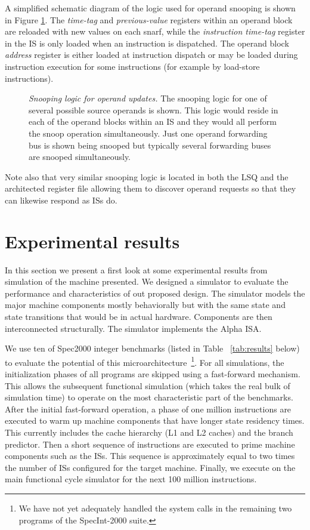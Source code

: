 \documentclass[10pt,dvips]{article}
\begin{document}
A simplified schematic diagram of the logic used for operand snooping
is shown in Figure \ref{fig:source}.
The {\em time-tag} and
{\em previous-value} registers within an operand block
are reloaded with new values on each snarf,
while the
{\em instruction time-tag} register in the IS
is only loaded when an instruction is dispatched.
The operand block {\em address} register is either loaded at instruction
dispatch or may be loaded during instruction execution for some
instructions
(for example by load-store instructions).
%
\begin{figure}
\centering
{}
\caption{{\em Snooping logic for operand updates.} 
\small{
The snooping
logic for one of several possible source operands is shown.
This logic would reside in each of the operand blocks within an 
IS and they would all perform the snoop operation
simultaneously.
Just one operand forwarding bus is shown being snooped but
typically several forwarding buses are snooped simultaneously.
}
}
\label{fig:source}
\end{figure}
%
Note also that very similar snooping logic is located in
both the LSQ and the architected register file allowing
them to discover operand requests so that they can likewise respond
as ISs do.
%
%
\vspace{-0.15in}
\section{Experimental results}
%
In this section we present a first look at some
experimental results from simulation
of the machine presented.
We designed a simulator to evaluate the performance
and characteristics of out proposed design.
The simulator models the major machine components mostly behaviorally
but with the same state and state transitions that would be
in actual hardware.  Components are then interconnected 
structurally.  The simulator implements the Alpha ISA.

We use ten of Spec2000 integer benchmarks 
(listed in Table ~\ref{tab:results} below) to evaluate the potential
of this microarchitecture~\footnote{We have not yet adequately handled
the system calls in the remaining two programs of the SpecInt-2000 suite.}.
For all simulations, the initialization phases of all
programs are skipped using a fast-forward mechanism.
This allows the subsequent functional simulation (which takes
the real bulk of simulation time) to operate on the most
characteristic part of the benchmarks.
After the initial fast-forward operation, a phase of one million 
instructions are executed to warm up machine components that have longer
state residency times.  This currently includes the cache hierarchy
(L1 and L2 caches) and the branch predictor.
Then a short sequence of instructions are 
executed to prime machine components such as the ISs.
This sequence is approximately equal to two times the number
of ISs configured for the target machine.
Finally, we execute on the main functional cycle simulator
for the next 100 million instructions.  
\end{document}
